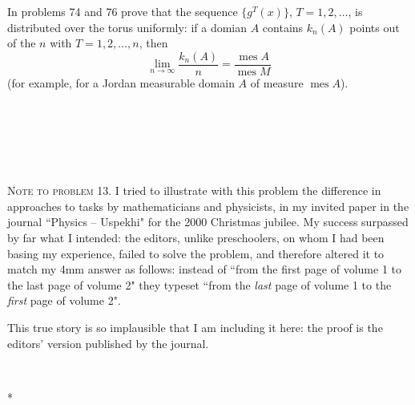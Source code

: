 \documentclass[12pt]{article}  %
\begin{document}
\bigskip
{} In problems 74 and 76 prove that the sequence $\{g^T (x)\}$, $T=1, 2, \dots$, is distributed
over the torus uniformly: if a domian $A$ contains $k_n(A)$ points out of the $n$ with $T=1, 2, \dots,n$, then
$$
\lim_{n \to \infty} \frac{k_n(A)}{n}=\frac{\operatorname{mes} A}{\operatorname{mes} M}
$$
(for example, for a Jordan measurable domain $A$ of measure $\operatorname{mes} A$).

\ 

\ 

\ 

\textsc{Note to problem 13.} I tried to illustrate with this problem the difference in approaches to tasks by mathematicians and physicists, in my invited paper in the journal ``Physics -- Uspekhi" for the 2000 Christmas jubilee. My success surpassed by far what I intended: the editors, unlike preschoolers, on whom I had been basing my experience, failed to solve the problem, and therefore altered it to match my 4mm answer as follows: instead of ``from the first page of volume 1 to the last page of volume 2"  they typeset  ``from the {\em last\/} page of volume 1 to the {\em first\/} page of volume 2".

This true story is so implausible that I am including it here: the proof is the editors' version published by the journal.  

\ 

\vspace{0pt plus 12pt}
\centerline{*\quad *\quad*}
\vspace{.4\baselineskip}

\

\ 

\ 

{\em
{}
}
\end{document}
